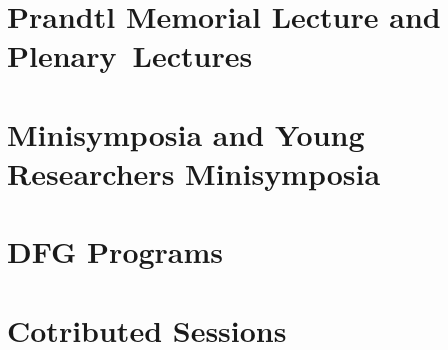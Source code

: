 \documentclass[colorlinks]{gamm-boa}
\begin{document}
 \tableofcontents
\chapter{Prandtl Memorial Lecture and Plenary~Lectures}









\chapter{Minisymposia and Young Researchers Minisymposia}










\chapter{DFG Programs}






\chapter{Cotributed Sessions}




























\printindex
\end{document}

